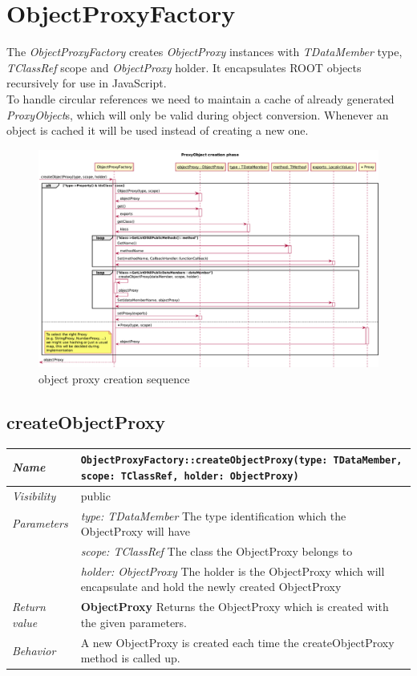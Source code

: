 \chapter{ObjectProxyFactory}
The \textit{ObjectProxyFactory} creates \textit{ObjectProxy} instances with \textit{TDataMember} type, \textit{TClassRef} scope and \textit{ObjectProxy} holder. It encapsulates ROOT objects recursively for use in JavaScript.\\

To handle circular references we need to maintain a cache of already generated \textit{ProxyObject}s, which will only be valid during object conversion. Whenever an object is cached it will be used instead of creating a new one.
\begin{figure}[H]
	\centering
	\includegraphics[width=18cm]{./latex/resources/createProxyObject.pdf}
	\caption{object proxy creation sequence}
\end{figure} \pagebreak
\section{createObjectProxy}
\begin{longtable}{p{3cm} @{\hskip 1cm} p{12cm}}
 \hline
\textit{Name} & \texttt{ObjectProxyFactory::createObjectProxy(type: TDataMember, scope: TClassRef, holder: ObjectProxy)}\\
\hline
 \textit{Visibility} & public\\
\hline
\textit{Parameters} & \textit{type: TDataMember} The type identification which the ObjectProxy will have \\
& \textit{scope: TClassRef} The class the ObjectProxy belongs to \\
& \textit{holder: ObjectProxy}  The holder is the ObjectProxy which will encapsulate and hold the newly created ObjectProxy \\
\hline
\textit{Return value} & \textbf{ObjectProxy} Returns the ObjectProxy which is created with the given parameters.\\
  \hline
 \textit{Behavior} & A new ObjectProxy is created each time the createObjectProxy method is called up. \\
\hline
\end{longtable} \pagebreak
